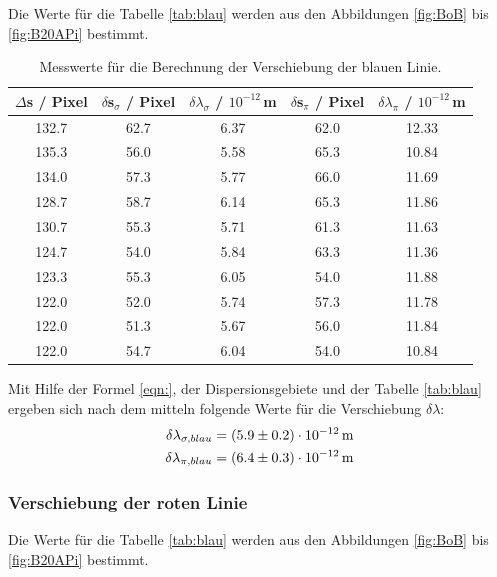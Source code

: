 Die Werte für die Tabelle \eqref{tab:blau} werden aus den Abbildungen \eqref{fig:BoB} bis \eqref{fig:B20APi} bestimmt.

\begin{table}[H]
  \centering
  \caption{Messwerte für die Berechnung der Verschiebung der blauen Linie.}
  \label{tab:blau}
  \begin{tabular}{c | c c | c c}
    $\Delta$s / Pixel & $\delta$s$_{\sigma}$ / Pixel & $\delta \lambda_{\sigma}$ / $10^{-12}$\,m & $\delta$s$_{\pi}$ / Pixel & $\delta \lambda_{\pi}$ / $10^{-12}$\,m \\
    \hline
    132.7 & 62.7 & 6.37 & 62.0 & 12.33 \\
    135.3 & 56.0 & 5.58 & 65.3 & 10.84 \\
    134.0 & 57.3 & 5.77 & 66.0 & 11.69 \\
    128.7 & 58.7 & 6.14 & 65.3 & 11.86 \\
    130.7 & 55.3 & 5.71 & 61.3 & 11.63 \\
    124.7 & 54.0 & 5.84 & 63.3 & 11.36 \\
    123.3 & 55.3 & 6.05 & 54.0 & 11.88 \\
    122.0 & 52.0 & 5.74 & 57.3 & 11.78 \\
    122.0 & 51.3 & 5.67 & 56.0 & 11.84 \\
    122.0 & 54.7 & 6.04 & 54.0 & 10.84 \\
    \hline
  \end{tabular}
\end{table}


Mit Hilfe der Formel \eqref{eqn:}, der Dispersionsgebiete und der Tabelle \eqref{tab:blau} ergeben sich nach dem mitteln folgende Werte für die Verschiebung $\delta\lambda$:
\begin{align*}
  \delta \lambda_{\sigma,blau} = (\num{5.9 +- 0.2})\cdot 10^{-12}\,\text{m} \\
  \delta \lambda_{\pi,blau} = (\num{6.4 +- 0.3})\cdot 10^{-12}\,\text{m}
\end{align*}



\subsubsection{Verschiebung der roten Linie}



Die Werte für die Tabelle \eqref{tab:blau} werden aus den Abbildungen \eqref{fig:BoB} bis \eqref{fig:B20APi} bestimmt.

